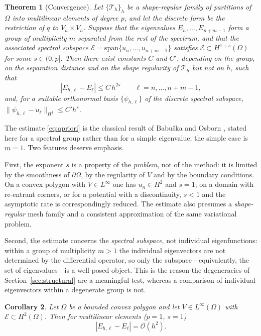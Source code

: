 \documentclass[pdflatex,sn-mathphys-num]{sn-jnl}
\theoremstyle{thmstyleone}%
\newtheorem{theorem}{Theorem}%
\newtheorem{corollary}[theorem]{Corollary}%
\theoremstyle{thmstyletwo}%
\theoremstyle{thmstylethree}%
\begin{document}
\begin{theorem}[Convergence]\label{thm:conv}
Let $\{\mathcal{T}_h\}_h$ be a shape-regular family of partitions of $\Omega$
into multilinear elements of degree $p$, and let the discrete form be the
restriction of $q$ to $V_h\times V_h$. Suppose that the eigenvalues
$E_{n}, \dots, E_{n+m-1}$ form a group of multiplicity $m$ separated from the
rest of the spectrum, and that the associated spectral subspace
$\mathcal{E} = \mathrm{span}\{u_n,\dots,u_{n+m-1}\}$ satisfies
$\mathcal{E} \subset H^{1+s}(\Omega)$ for some $s \in (0,p]$. Then there exist
constants $C$ and $C'$, depending on the group, on the separation distance and
on the shape regularity of $\mathcal{T}_h$ but not on $h$, such that
%
\begin{equation}\label{eq:apriori}
  |E_{h,\ell} - E_\ell| \leq C\, h^{2s}
  \qquad \ell = n,\dots,n+m-1 ,
\end{equation}
%
and, for a suitable orthonormal basis $\{\psi_{h,\ell}\}$ of the discrete
spectral subspace,
$\|\psi_{h,\ell} - u_\ell\|_{H^1} \leq C' h^{s}$.
\end{theorem}

The estimate \eqref{eq:apriori} is the classical result of Babu\v{s}ka and
Osborn \cite{babuska1991,boffi2010}, stated here for a spectral group rather than
for a simple eigenvalue; the simple case is $m = 1$. Two features deserve
emphasis.

First, the exponent $s$ is a property of the \emph{problem}, not of the method:
it is limited by the smoothness of $\partial\Omega$, by the regularity of $V$
and by the boundary conditions. On a convex polygon with $V \in L^\infty$ one has
$u_n \in H^2$ and $s = 1$; on a domain with re-entrant corners, or for a
potential with a discontinuity, $s < 1$ and the asymptotic rate is correspondingly
reduced. The estimate also presumes a \emph{shape-regular} mesh family and a
consistent approximation of the same variational problem.

Second, the estimate concerns the \emph{spectral subspace}, not individual
eigenfunctions: within a group of multiplicity $m > 1$ the individual
eigenvectors are not determined by the differential operator, so only the
subspace---equivalently, the set of eigenvalues---is a well-posed object. This is
the reason the degeneracies of Section~\ref{sec:structural} are a meaningful
test, whereas a comparison of individual eigenvectors within a degenerate group
is not.

\begin{corollary}\label{cor:order}
Let $\Omega$ be a bounded convex polygon and let $V \in L^\infty(\Omega)$ with
$\mathcal{E} \subset H^2(\Omega)$. Then for multilinear elements ($p = 1$,
$s = 1$)
%
\begin{equation}
  |E_{h,\ell} - E_\ell| = \mathcal{O}(h^2) .
\end{equation}
\end{corollary}
\end{document}
